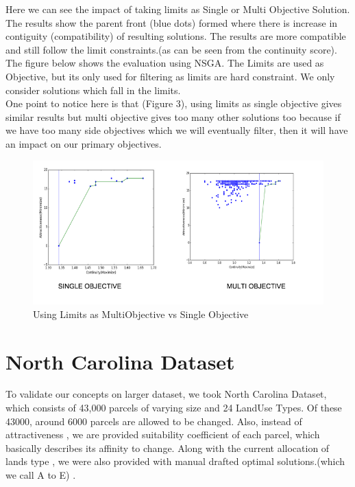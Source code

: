 \documentclass[12pt]{article} %
\begin{document}
Here we can see the impact of taking limits as Single or Multi Objective Solution.
The results show the parent front (blue dots) formed where there is increase in contiguity (compatibility) of resulting solutions. The results are more compatible and still follow the limit constraints.(as can be seen from the continuity score). \\[.25cm]

The figure below shows the evaluation using NSGA. The  Limits are used as Objective, but its only used for filtering as limits are hard constraint. We only consider solutions which fall in the limits. \\
 One point to notice here is that (Figure 3), using limits as single objective gives similar results but multi objective gives too many other solutions too because if we have too many side objectives which we will eventually filter, then it will have an impact on our primary objectives.\\


\begin{figure}[h]
\begin{center}
\includegraphics[width=4.5in]{svd.png}
\caption{Using Limits as MultiObjective vs Single Objective}
\end{center}
\end{figure}
\newpage

\newpage
\section{North Carolina Dataset}
To validate our concepts on larger dataset, we took North Carolina Dataset, which consists of 43,000 parcels of varying size and 24 LandUse Types. Of these 43000, around 6000 parcels are allowed to be changed. Also, instead of attractiveness , we are provided suitability coefficient of each parcel, which basically describes its affinity to change. Along with the current allocation of lands type , we were also provided with manual drafted optimal solutions.(which we call A to E) . \\
\end{document}
